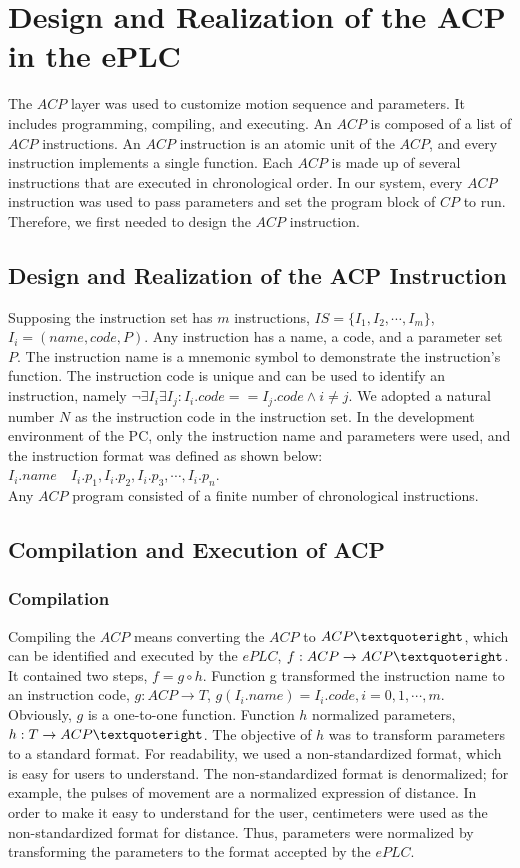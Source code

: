 \documentclass[journal]{IEEEtran}
\begin{document}
\section{Design and Realization of the ACP in the ePLC}
\label{ACP-PLC2}
The $ACP$ layer was used to customize motion sequence and parameters. It includes programming, compiling, and executing. An $ACP$ is composed of a list of $ACP$ instructions. An $ACP$ instruction is an atomic unit of the $ACP$, and every instruction implements a single function. Each $ACP$ is made up of several instructions that are executed in chronological order. In our system, every $ACP$ instruction was used to pass parameters and set the program block of $CP$ to run. Therefore, we first needed to design the $ACP$ instruction.
\subsection{Design and Realization of the ACP Instruction}
Supposing the instruction set has $m$ instructions, $IS=\{I_1,I_2,\cdots,I_m\}$, $I_i=(name,code,P)$. Any instruction has a name, a code, and a parameter set $P$. The instruction name is a mnemonic symbol to demonstrate the instruction's function. The instruction code is unique and can be used to identify an instruction, namely $\neg \exists I_i \exists I_j:I_i.code==I_j.code\wedge i\neq j$. We adopted a natural number $N$ as the instruction code in the instruction set.
 In the development environment of the PC, only the instruction name and parameters were used, and the instruction format was defined as shown below:\\
$I_i.name \quad I_i.p_1,I_i.p_2,I_i.p_3,\cdots,I_i.p_n$.\\
Any $ACP$ program consisted of a finite number of chronological instructions.
\subsection{Compilation and Execution of ACP}
\subsubsection{Compilation}
Compiling the $ACP$ means converting the $ACP$ to $ACP\textquoteright$, which can be identified and executed by the $ePLC$, $f:ACP \rightarrow ACP\textquoteright$. It contained two steps, $f=g\circ h$.
% 
% 
Function g transformed the instruction name to an instruction code, $g: ACP \rightarrow T$, $g(I_i.name)=I_i.code,i=0,1,\cdots,m$. Obviously, $g$ is a one-to-one function.
Function $h$ normalized parameters, $h:T\rightarrow ACP\textquoteright$. The objective of $h$ was to transform parameters to a standard format. For readability, we used a non-standardized format, which is easy for users to understand. The non-standardized format is denormalized; for example, the pulses of movement are a normalized expression of distance. In order to make it easy to understand for the user, centimeters were used as the non-standardized format for distance. Thus, parameters were normalized by transforming the parameters to the format accepted by the $ePLC$.
\end{document}
